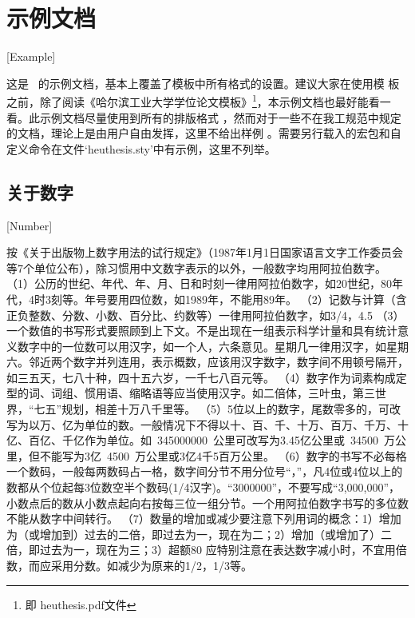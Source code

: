 
\chapter{示例文档}[Example]

这是 \heuthesis\ 的示例文档，基本上覆盖了模板中所有格式的设置。建议大家在使用模
板之前，除了阅读《\heuthesis\:哈尔滨工业大学学位论文模板》\footnote{即
heuthesis.pdf文件}，本示例文档也最好能看一看。此示例文档尽量使用到所有的排版格式
，然而对于一些不在我工规范中规定的文档，理论上是由用户自由发挥，这里不给出样例
。需要另行载入的宏包和自定义命令在文件`heuthesis.sty'中有示例，这里不列举。

\section{关于数字}[Number]

按《关于出版物上数字用法的试行规定》（1987年1月1日国家语言文字工作委员会等7个单位公布），除习惯用中文数字表示的以外，一般数字均用阿拉伯数字。
（1）公历的世纪、年代、年、月、日和时刻一律用阿拉伯数字，如20世纪，80年代，4时3刻等。年号要用四位数，如1989年，不能用89年。
（2）记数与计算（含正负整数、分数、小数、百分比、约数等）一律用阿拉伯数字，如3/4，4.5%
（3）一个数值的书写形式要照顾到上下文。不是出现在一组表示科学计量和具有统计意义数字中的一位数可以用汉字，如一个人，六条意见。星期几一律用汉字，如星期六。邻近两个数字并列连用，表示概数，应该用汉字数字，数字间不用顿号隔开，如三五天，七八十种，四十五六岁，一千七八百元等。
（4）数字作为词素构成定型的词、词组、惯用语、缩略语等应当使用汉字。如二倍体，三叶虫，第三世界，“七五”规划，相差十万八千里等。
（5）5位以上的数字，尾数零多的，可改写为以万、亿为单位的数。一般情况下不得以十、百、千、十万、百万、千万、十亿、百亿、千亿作为单位。如~\num{345000000}~公里可改写为3.45亿公里或~\num{34500}~万公里，但不能写为3亿~\num{4500}~万公里或3亿4千5百万公里。
（6）数字的书写不必每格一个数码，一般每两数码占一格，数字间分节不用分位号“，”，凡4位或4位以上的数都从个位起每3位数空半个数码(1/4汉字)。“\num{3000000}”，不要写成“3,000,000”，小数点后的数从小数点起向右按每三位一组分节。一个用阿拉伯数字书写的多位数不能从数字中间转行。
（7）数量的增加或减少要注意下列用词的概念：1）增加为（或增加到）过去的二倍，即过去为一，现在为二；2）增加（或增加了）二倍，即过去为一，现在为三；3）超额80%
应特别注意在表达数字减小时，不宜用倍数，而应采用分数。如减少为原来的1/2，1/3等。


